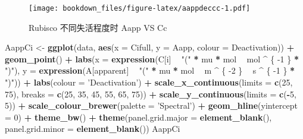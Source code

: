 \documentclass[
]{krantz}
\makeatletter
\newenvironment{Shaded}{\begin{snugshade}}{\end{snugshade}}
\newcommand{\DataTypeTok}[1]{\textcolor[rgb]{0.13,0.29,0.53}{#1}}
\newcommand{\DecValTok}[1]{\textcolor[rgb]{0.00,0.00,0.81}{#1}}
\newcommand{\KeywordTok}[1]{\textcolor[rgb]{0.13,0.29,0.53}{\textbf{#1}}}
\newcommand{\NormalTok}[1]{#1}
\newcommand{\OperatorTok}[1]{\textcolor[rgb]{0.81,0.36,0.00}{\textbf{#1}}}
\newcommand{\StringTok}[1]{\textcolor[rgb]{0.31,0.60,0.02}{#1}}
\newenvironment{kframe}{%
\medskip{}
\setlength{\fboxsep}{.8em}
 \def\at@end@of@kframe{}%
 \ifinner\ifhmode%
  \def\at@end@of@kframe{\end{minipage}}%
  \begin{minipage}{\columnwidth}%
 \fi\fi%
 \def\FrameCommand##1{\hskip\@totalleftmargin \hskip-\fboxsep
 \colorbox{shadecolor}{##1}\hskip-\fboxsep
     \hskip-\linewidth \hskip-\@totalleftmargin \hskip\columnwidth}%
 \MakeFramed {\advance\hsize-\width
   \@totalleftmargin\z@ \linewidth\hsize
   \@setminipage}}%
 {\par\unskip\endMakeFramed%
 \at@end@of@kframe}
\renewenvironment{Shaded}{\begin{kframe}}{\end{kframe}}
\makeatother
\begin{document}
\begin{figure}
\centering
\texttt{[image: bookdown\_files/figure-latex/aappdeccc-1.pdf]}
\caption{\label{fig:aappdeccc}Rubisco 不同失活程度时 Aapp VS Cc}
\end{figure}

\begin{Shaded}
\begin{Highlighting}[]
\NormalTok{AappCi <-}
\StringTok{  }\KeywordTok{ggplot}\NormalTok{(data, }\KeywordTok{aes}\NormalTok{(}\DataTypeTok{x =}\NormalTok{ Cifull, }\DataTypeTok{y =}\NormalTok{ Aapp, }\DataTypeTok{colour =}\NormalTok{ Deactivation)) }\OperatorTok{+}
\StringTok{  }\KeywordTok{geom_point}\NormalTok{() }\OperatorTok{+}
\StringTok{  }\KeywordTok{labs}\NormalTok{(}\DataTypeTok{x =} \KeywordTok{expression}\NormalTok{(C[i] }\OperatorTok{~}\StringTok{ "("} \OperatorTok{*}\StringTok{ }\NormalTok{mu }\OperatorTok{*}\StringTok{ }\NormalTok{mol }\OperatorTok{~}\StringTok{ }\NormalTok{mol }\OperatorTok{^}\StringTok{ }\NormalTok{\{}
    \DecValTok{-1}
\NormalTok{  \} }\OperatorTok{*}\StringTok{ ")"}\NormalTok{),}
  \DataTypeTok{y =} \KeywordTok{expression}\NormalTok{(A[apparent] }\OperatorTok{~}\StringTok{ "("} \OperatorTok{*}\StringTok{ }\NormalTok{mu }\OperatorTok{*}\StringTok{ }\NormalTok{mol }\OperatorTok{~}\StringTok{ }\NormalTok{m }\OperatorTok{^}\StringTok{ }\NormalTok{\{}
    \DecValTok{-2}
\NormalTok{  \} }\OperatorTok{~}\StringTok{ }\NormalTok{s }\OperatorTok{^}\StringTok{ }\NormalTok{\{}
    \DecValTok{-1}
\NormalTok{  \} }\OperatorTok{*}\StringTok{ ")"}\NormalTok{)) }\OperatorTok{+}
\StringTok{  }\KeywordTok{labs}\NormalTok{(}\DataTypeTok{colour =} \StringTok{'Deactivation'}\NormalTok{) }\OperatorTok{+}
\StringTok{  }\KeywordTok{scale_x_continuous}\NormalTok{(}\DataTypeTok{limits =} \KeywordTok{c}\NormalTok{(}\DecValTok{25}\NormalTok{, }\DecValTok{75}\NormalTok{),}
                     \DataTypeTok{breaks =} \KeywordTok{c}\NormalTok{(}\DecValTok{25}\NormalTok{, }\DecValTok{35}\NormalTok{, }\DecValTok{45}\NormalTok{, }\DecValTok{55}\NormalTok{, }\DecValTok{65}\NormalTok{, }\DecValTok{75}\NormalTok{)) }\OperatorTok{+}
\StringTok{  }\KeywordTok{scale_y_continuous}\NormalTok{(}\DataTypeTok{limits =} \KeywordTok{c}\NormalTok{(}\OperatorTok{-}\DecValTok{5}\NormalTok{, }\DecValTok{5}\NormalTok{)) }\OperatorTok{+}
\StringTok{  }\KeywordTok{scale_colour_brewer}\NormalTok{(}\DataTypeTok{palette =} \StringTok{'Spectral'}\NormalTok{) }\OperatorTok{+}
\StringTok{  }\KeywordTok{geom_hline}\NormalTok{(}\DataTypeTok{yintercept =} \DecValTok{0}\NormalTok{) }\OperatorTok{+}
\StringTok{  }\KeywordTok{theme_bw}\NormalTok{() }\OperatorTok{+}
\StringTok{  }\KeywordTok{theme}\NormalTok{(}\DataTypeTok{panel.grid.major =} \KeywordTok{element_blank}\NormalTok{(),}
        \DataTypeTok{panel.grid.minor =} \KeywordTok{element_blank}\NormalTok{())}
\NormalTok{AappCi}
\end{Highlighting}
\end{Shaded}
\end{document}
